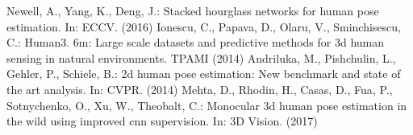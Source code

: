 \documentclass[runningheads]{llncs}
\begin{document}
\begin{thebibliography}{11}
 Newell, A., Yang, K., Deng, J.: Stacked hourglass networks for human pose estimation. In: ECCV. (2016)
 Ionescu, C., Papava, D., Olaru, V., Sminchisescu, C.: Human3. 6m: Large scale datasets and predictive methods for 3d human sensing in natural environments. TPAMI (2014)
 Andriluka, M., Pishchulin, L., Gehler, P., Schiele, B.: 2d human pose estimation: New benchmark and state of the art analysis. In: CVPR. (2014)
 Mehta, D., Rhodin, H., Casas, D., Fua, P., Sotnychenko, O., Xu, W., Theobalt, C.: Monocular 3d human pose estimation in the wild using improved cnn supervision. In: 3D Vision. (2017)
\end{thebibliography}
\end{document}
